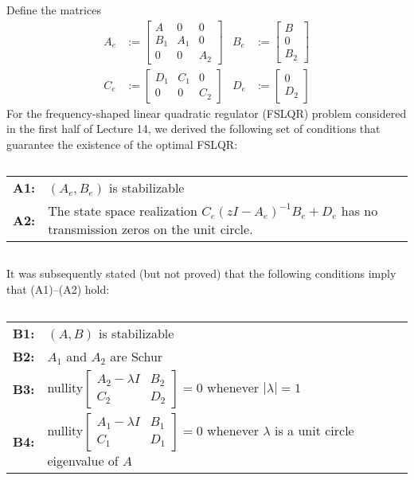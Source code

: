 \item
Define the matrices
\begin{align*}
    A_e & := \begin{bmatrix}
            A & 0 & 0 \\
            B_1 & A_1 & 0 \\
            0 & 0 & A_2
        \end{bmatrix} 
        & B_e & := \begin{bmatrix}
            B \\
            0 \\
            B_2
        \end{bmatrix} \\
    C_e & := \begin{bmatrix}
            D_1 & C_1 & 0 \\
            0 & 0 & C_2
        \end{bmatrix}
        & D_e & := \begin{bmatrix}
            0 \\
            D_2
        \end{bmatrix}
\end{align*}
For the frequency-shaped linear quadratic regulator (FSLQR) problem considered in the first half of Lecture 14, we derived the following set of conditions that guarantee the existence of the optimal FSLQR:

$\,$

\begin{tabular}{p{0.5cm}p{14cm}}
    \textbf{A1:} & $(A_e,B_e)$ is stabilizable \\
    \textbf{A2:} & The state space realization $C_e (zI - A_e)^{-1} B_e + D_e$ has no transmission zeros on the unit circle.
\end{tabular}

$\,$

It was subsequently stated (but not proved) that the following conditions imply that (A1)--(A2) hold:

$\,$

\begin{tabular}{p{0.5cm}p{14cm}}
    \textbf{B1:} 
        & $(A,B)$ is stabilizable \\
    \textbf{B2:} 
        & $A_1$ and $A_2$ are Schur \\
    \textbf{B3:}
        & nullity$\begin{bmatrix} A_2 - \lambda I & B_2 \\ C_2 & D_2 \end{bmatrix} = 0$ whenever $|\lambda| = 1$ \\
    \textbf{B4:}
        & nullity$\begin{bmatrix} A_1 - \lambda I & B_1 \\ C_1 & D_1 \end{bmatrix} = 0$ whenever $\lambda$ is a unit circle eigenvalue of $A$
\end{tabular}


